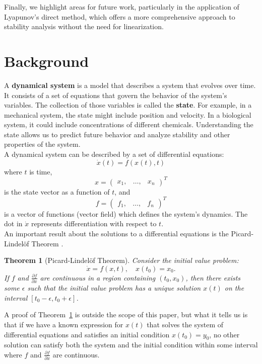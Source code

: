 \documentclass[12pt]{article}
\newtheorem{theorem}{Theorem}[section]
\newcommand{\dx}{\dot{x}}
\begin{document}
Finally, we highlight areas for future work, particularly in the application of Lyapunov’s direct method, which offers a more comprehensive approach to stability analysis without the need for linearization.

\section{Background}

A \textbf{dynamical system} is a model that describes a system that evolves over time. It consists of a set of equations that govern the behavior of the system's variables. The collection of those variables is called the \textbf{state}. For example, in a mechanical system, the state might include position and velocity. In a biological system, it could include concentrations of different chemicals. Understanding the state allows us to predict future behavior and analyze stability and other properties of the system. \\

A dynamical system can be described by a set of differential equations: $$\dx(t) = f(x(t), t)$$
where $t$ is time,
$$x = 
\begin{pmatrix}
x_1, & \ldots, & x_n
\end{pmatrix}^T$$
is the state vector as a function of $t$, and
$$f = 
\begin{pmatrix}
f_1, & \ldots, & f_n
\end{pmatrix}^T$$
is a vector of functions (vector field) which defines the system's dynamics. The dot in $\dx$ represents differentiation with respect to $t$. \\

An important result about the solutions to a differential equations is the Picard-Lindelöf Theorem \cite{Gut13,Nag94}.

\begin{theorem}[Picard-Lindelöf Theorem]
\label{thm:picard}
Consider the initial value problem:
$$\dx = f(x, t), \quad x(t_0) = x_0.$$
If $f$ and $\frac{\partial f}{\partial x}$ are continuous in a region containing $(t_0, x_0)$, then there exists some $\epsilon$ such that the initial value problem has a unique solution $x(t)$ on the interval $[t_0 - \epsilon, t_0 + \epsilon]$.
\end{theorem}

A proof of Theorem~\ref{thm:picard} is outside the scope of this paper, but what it tells us is that if we have a known expression for $x(t)$ that solves the system of differential equations and satisfies an initial condition $x(t_0) = y_0$, no other solution can satisfy both the system and the initial condition within some interval where $f$ and $\frac{\partial f}{\partial x}$ are continuous. \\
\end{document}
